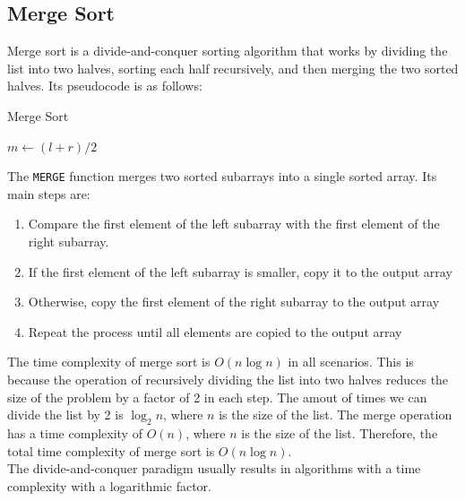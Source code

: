 \subsection{Merge Sort}

Merge sort is a divide-and-conquer sorting algorithm that works by dividing the
list into two halves, sorting each half recursively, and then merging the two
sorted halves. Its pseudocode is as follows:

\begin{algorithm}[H]
    \caption{Merge Sort}
    \begin{algorithmic}[1]
                \State $m \gets (l + r) / 2$
                \State {}
                \State {}
                \State {}
            \EndIf
        \EndFunction
    \end{algorithmic}
\end{algorithm}

The \texttt{MERGE} function merges two sorted subarrays into a single sorted array. 
Its main steps are:

\begin{enumerate}
    \item Compare the first element of the left subarray with the first element of the 
    right subarray.
    \item If the first element of the left subarray is smaller, copy it to the output 
    array
    \item Otherwise, copy the first element of the right subarray to the output array
    \item Repeat the process until all elements are copied to the output array
\end{enumerate}

The time complexity of merge sort is $O(n \log n)$ in all scenarios. This is because 
the operation of recursively dividing the list into two halves reduces the size of 
the problem by a factor of 2 in each step. The amout of times we can divide the list 
by 2 is $\log_2 n$, where $n$ is the size of the list. The merge operation has a time 
complexity of $O(n)$, where $n$ is the size of the list. Therefore, the total time 
complexity of merge sort is $O(n \log n)$.\\

The divide-and-conquer paradigm usually results in algorithms with a time complexity
with a logarithmic factor. 

